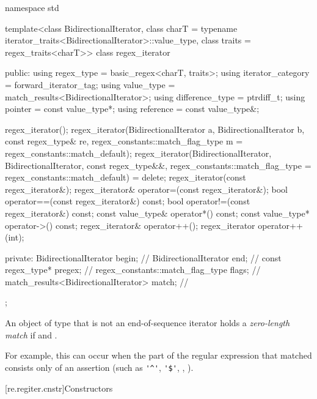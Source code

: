 \begin{codeblock}
namespace std {
  template<class BidirectionalIterator,
            class charT = typename iterator_traits<BidirectionalIterator>::value_type,
            class traits = regex_traits<charT>>
    class regex_iterator {
    public:
      using regex_type        = basic_regex<charT, traits>;
      using iterator_category = forward_iterator_tag;
      using value_type        = match_results<BidirectionalIterator>;
      using difference_type   = ptrdiff_t;
      using pointer           = const value_type*;
      using reference         = const value_type&;

      regex_iterator();
      regex_iterator(BidirectionalIterator a, BidirectionalIterator b,
                     const regex_type& re,
                     regex_constants::match_flag_type m = regex_constants::match_default);
      regex_iterator(BidirectionalIterator, BidirectionalIterator,
                     const regex_type&&,
                     regex_constants::match_flag_type = regex_constants::match_default) = delete;
      regex_iterator(const regex_iterator&);
      regex_iterator& operator=(const regex_iterator&);
      bool operator==(const regex_iterator&) const;
      bool operator!=(const regex_iterator&) const;
      const value_type& operator*() const;
      const value_type* operator->() const;
      regex_iterator& operator++();
      regex_iterator operator++(int);

    private:
      BidirectionalIterator                begin;  // \expos
      BidirectionalIterator                end;    // \expos
      const regex_type*                    pregex; // \expos
      regex_constants::match_flag_type     flags;  // \expos
      match_results<BidirectionalIterator> match;  // \expos
    };
}
\end{codeblock}

\pnum
{}%
An object of type  that is not an end-of-sequence iterator
holds a \textit{zero-length match} if  and
. \begin{note} For
example, this can occur when the part of the regular expression that
matched consists only of an assertion (such as \verb|'^'|, \verb|'$'|,
, ). \end{note}

[re.regiter.cnstr]{Constructors}

